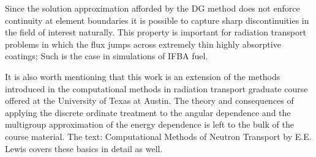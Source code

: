Since the solution approximation afforded by the DG method does not enforce continuity at
element boundaries it is possible to capture sharp discontinuities in the field
of interest naturally.  This property is important for radiation transport problems
in which the flux jumps across extremely thin highly absorptive coatings;
Such is the case in simulations of IFBA fuel.

It is also worth mentioning that this work is an extension of the methods introduced in
the computational methods in radiation transport graduate course offered at the University
of Texas at Austin.  The theory and consequences of applying the discrete ordinate treatment to the angular
dependence and the multigroup approximation of the energy dependence is left to the
bulk of the course material.
The text: Computational Methods of Neutron Transport by E.E. Lewis \cite{Lewis}
covers these basics in detail as well.
